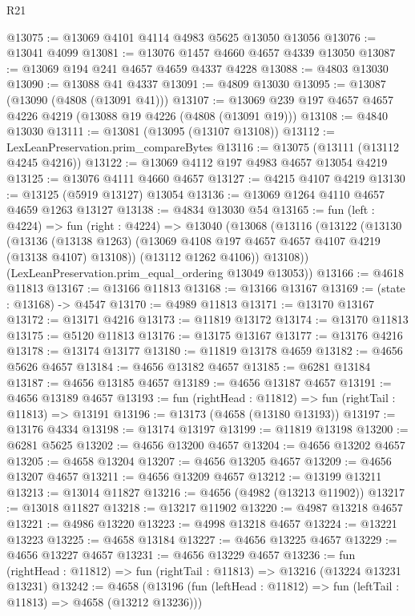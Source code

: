 \begin{lexlean}{R21}
\begin{coremodule}
@13075 := @13069 @4101 @4114 @4983 @5625 @13050 @13056
@13076 := @13041 @4099
@13081 := @13076 @1457 @4660 @4657 @4339 @13050
@13087 := @13069 @194 @241 @4657 @4659 @4337 @4228
@13088 := @4803 @13030
@13090 := @13088 @41 @4337
@13091 := @4809 @13030
@13095 := @13087 (@13090 (@4808 (@13091 @41)))
@13107 := @13069 @239 @197 @4657 @4657 @4226 @4219 (@13088 @19 @4226 (@4808 (@13091 @19)))
@13108 := @4840 @13030
@13111 := @13081 (@13095 (@13107 @13108))
@13112 := LexLeanPreservation.prim_compareBytes
@13116 := @13075 (@13111 (@13112 @4245 @4216))
@13122 := @13069 @4112 @197 @4983 @4657 @13054 @4219
@13125 := @13076 @4111 @4660 @4657
@13127 := @4215 @4107 @4219
@13130 := @13125 (@5919 @13127) @13054
@13136 := @13069 @1264 @4110 @4657 @4659 @1263 @13127
@13138 := @4834 @13030 @54
@13165 := fun (left : @4224) =>
  fun (right : @4224) =>
  @13040
    (@13068
      (@13116
        (@13122
          (@13130
            (@13136
              (@13138 @1263)
              (@13069 @4108 @197 @4657 @4657 @4107 @4219 (@13138 @4107) @13108))
            (@13112 @1262 @4106))
          @13108))
      (LexLeanPreservation.prim_equal_ordering @13049 @13053))
@13166 := @4618 @11813
@13167 := @13166 @11813
@13168 := @13166 @13167
@13169 := (state : @13168) -> @4547
@13170 := @4989 @11813
@13171 := @13170 @13167
@13172 := @13171 @4216
@13173 := @11819 @13172
@13174 := @13170 @11813
@13175 := @5120 @11813
@13176 := @13175 @13167
@13177 := @13176 @4216
@13178 := @13174 @13177
@13180 := @11819 @13178 @4659
@13182 := @4656 @5626 @4657
@13184 := @4656 @13182 @4657
@13185 := @6281 @13184
@13187 := @4656 @13185 @4657
@13189 := @4656 @13187 @4657
@13191 := @4656 @13189 @4657
@13193 := fun (rightHead : @11812) => fun (rightTail : @11813) => @13191
@13196 := @13173 (@4658 (@13180 @13193))
@13197 := @13176 @4334
@13198 := @13174 @13197
@13199 := @11819 @13198
@13200 := @6281 @5625
@13202 := @4656 @13200 @4657
@13204 := @4656 @13202 @4657
@13205 := @4658 @13204
@13207 := @4656 @13205 @4657
@13209 := @4656 @13207 @4657
@13211 := @4656 @13209 @4657
@13212 := @13199 @13211
@13213 := @13014 @11827
@13216 := @4656 (@4982 (@13213 @11902))
@13217 := @13018 @11827
@13218 := @13217 @11902
@13220 := @4987 @13218 @4657
@13221 := @4986 @13220
@13223 := @4998 @13218 @4657
@13224 := @13221 @13223
@13225 := @4658 @13184
@13227 := @4656 @13225 @4657
@13229 := @4656 @13227 @4657
@13231 := @4656 @13229 @4657
@13236 := fun (rightHead : @11812) => fun (rightTail : @11813) => @13216 (@13224 @13231 @13231)
@13242 := @4658
    (@13196 (fun (leftHead : @11812) => fun (leftTail : @11813) => @4658 (@13212 @13236)))

\end{coremodule}
\end{lexlean}
